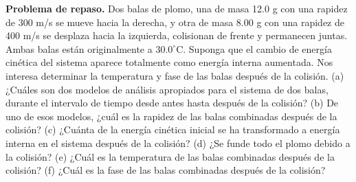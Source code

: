 \item \textbf{Problema de repaso.} Dos balas de plomo, una de masa 12.0 g con una rapidez de 300 m/s se mueve hacia la derecha, y otra de masa 8.00 g con una rapidez de 400 m/s se desplaza hacia la izquierda, colisionan de frente y permanecen juntas. Ambas balas están originalmente a $30.0^\circ\text{C}$. Suponga que el cambio de energía cinética del sistema aparece totalmente como energía interna aumentada. Nos interesa determinar la temperatura y fase de las balas después de la colisión. (a) ¿Cuáles son dos modelos de análisis apropiados para el sistema de dos balas, durante el intervalo de tiempo desde antes hasta después de la colisión? (b) De uno de esos modelos, ¿cuál es la rapidez de las balas combinadas después de la colisión? (c) ¿Cuánta de la energía cinética inicial se ha transformado a energía interna en el sistema después de la colisión? (d) ¿Se funde todo el plomo debido a la colisión? (e) ¿Cuál es la temperatura de las balas combinadas después de la colisión? (f) ¿Cuál es la fase de las balas combinadas después de la colisión?
